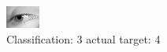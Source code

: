 \begin{figure}[h!]
\begin{center}
\includegraphics[width=0.60\columnwidth]{figures/ID3049_class_3_target_4.png}
\end{center}
\caption{ Classification: 3 actual target: 4}
\label{fig:ID3049_class_3_target_4}
\end{figure}
